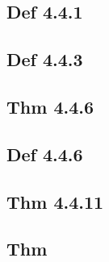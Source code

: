 \subsection*{Def 4.4.1}

\subsection*{Def 4.4.3}

\subsection*{Thm 4.4.6}

\subsection*{Def 4.4.6}

\subsection*{Thm 4.4.11}

\subsection*{Thm}


